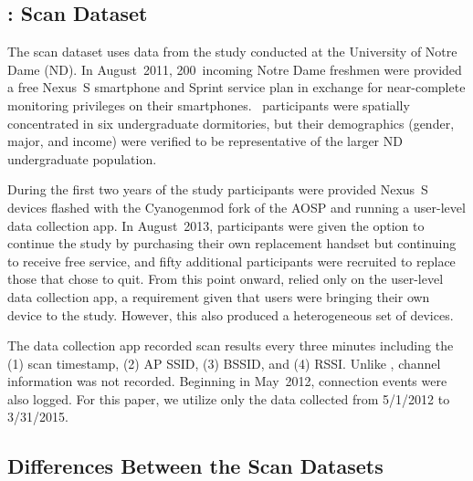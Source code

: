 
\subsection{\ndscan{}: \NetSense{} \wifi{} Scan Dataset}
\label{sec:netsense}

The \NetSense{} \wifi{} scan dataset uses data from the \NetSense{} study
conducted at the University of Notre Dame (ND).
%
In August~2011, 200~incoming Notre Dame freshmen were provided a free
Nexus~S smartphone and Sprint service plan in exchange for near-complete
monitoring privileges on their smartphones.
%
\NetSense{}~participants were spatially concentrated in six undergraduate
dormitories, but their demographics (gender, major, and income) were verified
to be representative of the larger ND undergraduate population.

During the first two years of the study \NetSense{} participants were
provided Nexus~S devices flashed with the Cyanogenmod fork of the AOSP and
running a user-level data collection app. In August~2013, participants were
given the option to continue the study by purchasing their own replacement
handset but continuing to receive free service, and fifty additional
participants were recruited to replace those that chose to quit. From this
point onward, \NetSense{} relied only on the user-level data collection app,
a requirement given that users were bringing their own device to the study.
However, this also produced a heterogeneous set of devices.

The \NetSense{} data collection app recorded scan results every three
minutes including the (1) scan timestamp, (2) AP SSID, (3) BSSID, and (4) RSSI.
Unlike \ubscan{}, channel information was not recorded.  Beginning in May~2012,
\wifi{} connection events were also logged. For this paper, we utilize only the
data collected from 5/1/2012 to 3/31/2015.

\subsection{Differences Between the Scan Datasets}



